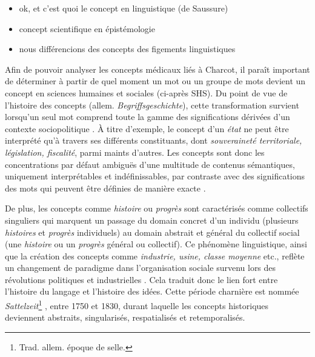 \begin{itemize}
\item ok, et c'est quoi le concept en linguistique (de Saussure)
\item concept scientifique en épistémologie
\item nous différencions des concepts des \og{}figements linguistiques\fg{} \citep{bezancon2023}
\end{itemize}






Afin de pouvoir analyser les concepts médicaux liés à Charcot, il paraît important de déterminer à partir de quel moment un mot ou un groupe de mots devient un concept en sciences humaines et sociales (ci-après SHS). Du point de vue de l'histoire des concepts (allem. \textit{Begriffsgeschichte}), cette transformation survient lorsqu'un seul mot comprend toute la gamme des significations dérivées d'un contexte sociopolitique \citep[p. 258]{koselleck2011introduction}. À titre d'exemple, le concept d'un \textit{état} ne peut être interprété qu'à travers ses différents constituants, dont \textit{souveraineté territoriale, législation, fiscalité}, parmi maints d'autres. Les concepts sont donc les concentrations par défaut ambiguës d'une multitude de contenus sémantiques, uniquement interprétables et indéfinissables, par contraste avec des significations des mots qui peuvent être définies de manière exacte \citep[p. 20]{koselleck2011introduction}. 

De plus, les concepts comme \textit{histoire} ou \textit{progrès} sont caractérisés comme \og{}collectifs singuliers\fg{} qui marquent un passage du domain concret d'un individu (plusieurs \textit{histoires} et \textit{progrès} individuels) au domain abstrait et général du collectif social (une \textit{histoire} ou un \textit{progrès} général ou collectif). Ce phénomène linguistique, ainsi que la création des concepts comme \textit{industrie, usine, classe moyenne} etc., reflète un changement de paradigme dans l'organisation sociale survenu lors des révolutions politiques et industrielles \citep[p. 1]{hobsbawm2010age}. Cela traduit donc le lien fort entre l'histoire du langage et l'histoire des idées. 
Cette période charnière est nommée \textit{Sattelzeit}\footnote{Trad. allem. \og{}époque de selle\fg{}.} \citep[p.~8]{koselleck2011introduction}, entre 1750 et 1830, durant laquelle les concepts historiques deviennent abstraits, singularisés, respatialisés et retemporalisés.
 
